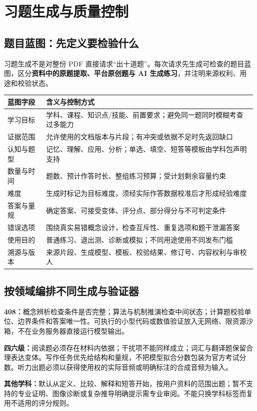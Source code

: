 \documentclass[UTF8,a4paper,11pt,fontset=none]{ctexart}
\newcommand{\cth}[1]{\textbf{\sffamily #1}}
\newcommand{\newsec}[1]{\clearpage\section{#1}}
\newenvironment{tbl}{\par\vspace{3pt}\small\noindent\ignorespaces}{\unskip\par\vspace{5pt}}
\begin{document}
\newsec{习题生成与质量控制}
\subsection{题目蓝图：先定义要检验什么}
习题生成不是对整份 PDF 直接请求“出十道题”。每次请求先生成可检查的题目蓝图，区分\textbf{资料中的原题提取、平台原创题与 AI 生成练习}，并注明来源权利、用途和校验状态。

\begin{tbl}
\begin{tabularx}{\linewidth}{@{}L{30mm}Y@{}}
\toprule
\cth{蓝图字段}&\cth{含义与控制方式}\\\midrule
学习目标&学科、课程、知识点/技能、前置要求；避免同一题同时模糊考查过多能力\\
证据范围&允许使用的文档版本与片段；有冲突或依据不足时先返回缺口\\
认知与题型&记忆、理解、应用、分析；单选、填空、短答等模板由学科包声明支持\\
数量与时间&题数、预计作答时长、整组练习预算；受计划剩余容量约束\\
难度&生成时标记为目标难度，须经实际作答数据校准后才形成经验难度\\
答案与量规&确定答案、可接受变体、评分点、部分得分与不可判定条件\\
错误选项&围绕真实易错概念设计，检查互斥性、重复选项和题干泄漏答案\\
使用目的&普通练习、退出测、诊断或模拟；不同用途使用不同发布门槛\\
溯源与版本&来源片段、生成模型、模板、校验结果、修订号、内容权利与审校人\\
\bottomrule
\end{tabularx}
\end{tbl}

\subsection{按领域编排不同生成与验证器}
\textbf{408：}概念辨析检查条件是否完整；算法与机制推演检查中间状态；计算题校验单位、边界条件和答案唯一性。可执行的小型代码或数值验证放入无网络、限资源沙箱，不在业务服务器直接运行模型输出。

\textbf{四六级：}阅读题必须存在材料内依据；干扰项不能同样成立；词汇与翻译题保留合理表达变体。写作任务优先给结构和量规，不把模型拟合分数包装为官方考试分数。听力出题必须以获得使用权的实际音频或明确标注的合成音频为输入。

\textbf{其他学科：}默认从定义、比较、解释和短答开始，按用户资料的范围出题；暂不支持的专业证明、图像诊断或复杂推导明确提示需专业审阅。不能只换学科标签而复用不适用的评分规则。
\end{document}
